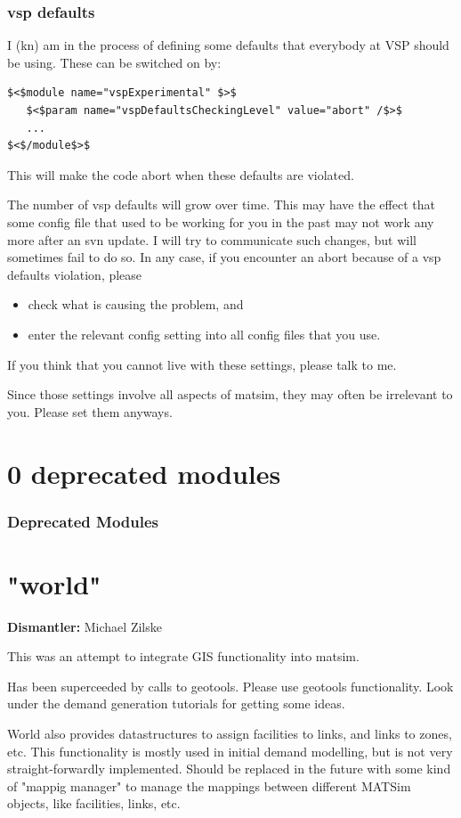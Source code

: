 \subsubsection{vsp defaults}

I (kn) am in the process of defining some defaults that everybody at VSP should be using. These can be switched on by:
\begin{verbatim}
$<$module name="vspExperimental" $>$
   $<$param name="vspDefaultsCheckingLevel" value="abort" /$>$
   ...
$<$/module$>$

\end{verbatim}

This will make the code abort when these defaults are violated.

The number of vsp defaults will grow over time. This may have  the effect that some config file that used to be working for you in the  past may not work any more after an svn update. I will try to  communicate such changes, but will sometimes fail to do so. In any  case, if you encounter an abort because of a vsp defaults violation,  please
\begin{itemize}
	\item check what is causing the problem, and
	\item enter the relevant config setting into all config files that you use.
\end{itemize}

If you think that you cannot live with these settings, please talk to me.

Since those settings involve all aspects of matsim, they may often be irrelevant to you. Please set them anyways.

\vfill\eject
\section{0 deprecated modules}

\subsubsection{Deprecated Modules}

\vfill\eject
\section{"world"}

\textbf{Dismantler:} Michael Zilske

This was an attempt to integrate GIS functionality into matsim.

Has been superceeded by calls to geotools. Please use geotools  functionality. Look under the demand generation tutorials for  getting some ideas.

World also provides datastructures to assign facilities to links, and  links to zones, etc. This functionality is mostly used in initial  demand modelling, but is not very straight-forwardly implemented. Should  be replaced in the future with some kind of "mappig manager" to manage  the mappings between different MATSim objects, like facilities, links,  etc.
